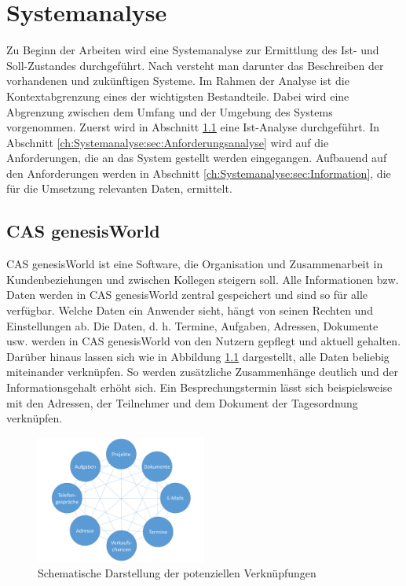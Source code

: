 
\chapter{Systemanalyse}
\label{ch:Systemanalyse}

Zu Beginn der Arbeiten wird eine Systemanalyse zur Ermittlung des Ist- und Soll-Zustandes durchgeführt. Nach \cite{SWB-380277719} versteht man darunter das Beschreiben der vorhandenen und zukünftigen Systeme. Im Rahmen der Analyse ist die Kontextabgrenzung eines der wichtigsten Bestandteile. Dabei wird eine Abgrenzung zwischen dem Umfang und der Umgebung des Systems vorgenommen. Zuerst wird in Abschnitt \ref{ch:Systemanalyse:sec:genesisWorld} eine Ist-Analyse durchgeführt. In Abschnitt \ref{ch:Systemanalyse:sec:Anforderungsanalyse} wird auf die Anforderungen, die an das System gestellt werden eingegangen. Aufbauend auf den Anforderungen werden in Abschnitt \ref{ch:Systemanalyse:sec:Information}, die für die Umsetzung relevanten Daten, ermittelt. 

\section{CAS genesisWorld}
\label{ch:Systemanalyse:sec:genesisWorld}

CAS genesisWorld ist eine Software, die Organisation und Zusammenarbeit in Kundenbeziehungen und zwischen Kollegen steigern soll. Alle Informationen bzw. Daten werden in CAS genesisWorld zentral gespeichert und sind so für alle verfügbar. Welche Daten ein Anwender sieht, hängt von seinen Rechten und Einstellungen ab. Die Daten, d. h. Termine, Aufgaben, Adressen, Dokumente usw. werden in CAS genesisWorld von den Nutzern gepflegt und aktuell gehalten. Darüber hinaus lassen sich wie in Abbildung \ref{picGwCon} dargestellt, alle Daten beliebig miteinander verknüpfen. So werden zusätzliche Zusammenhänge deutlich und der Informationsgehalt erhöht sich. Ein Besprechungstermin lässt sich beispielsweise mit den Adressen, der Teilnehmer und dem Dokument der Tagesordnung verknüpfen.

\begin{figure}[H]
	\centering
  \includegraphics[width=0.5\textwidth, width=0.5\textwidth]{pics/CAS_connections.pdf}
	\caption{Schematische Darstellung der potenziellen Verknüpfungen}
	\label{picGwCon}
\end{figure}

